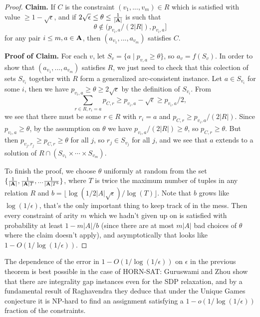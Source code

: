 \documentclass[letterpaper,11pt]{article}
\begin{document}
\begin{proof}
{\bf Claim.} If $C$ is the constraint $(v_1, ..., v_m) \in R$ which is satisfied with value $\ge 1 - \sqrt{\epsilon}$, and if $2\sqrt{\epsilon} \le \theta \le \frac{1}{|\mathbf{A}|}$ is such that
\[
\theta \not\in (p_{v_i,a}/(2|R|), p_{v_i,a}]
\]
for any pair $i \le m, a \in \mathbf{A}$, then $(a_{v_1}, ..., a_{v_m})$ satisfies $C$.

{\bf Proof of Claim.} For each $v$, let $S_v = \{a \mid p_{v,a} \ge \theta\}$, so $a_v = f(S_v)$. In order to show that $(a_{v_1}, ..., a_{v_m})$ satisfies $R$, we just need to check that this colection of sets $S_{v_i}$ together with $R$ form a generalized arc-consistent instance. Let $a \in S_{v_i}$ for some $i$, then we have $p_{v_i,a} \ge \theta \ge 2\sqrt{\epsilon}$ by the definition of $S_{v_i}$. From
\[
\sum_{r \in R, r_i = a} p_{C,r} \ge p_{v_i,a} - \sqrt{\epsilon} \ge p_{v_i,a}/2,
\]
we see that there must be some $r \in R$ with $r_i = a$ and $p_{C,r} \ge p_{v_i,a}/(2|R|)$. Since $p_{v_i,a} \ge \theta$, by the assumption on $\theta$ we have $p_{v_i,a}/(2|R|) \ge \theta$, so $p_{C,r} \ge \theta$. But then $p_{v_j,r_j} \ge p_{C,r} \ge \theta$ for all $j$, so $r_j \in S_{v_j}$ for all $j$, and we see that $a$ extends to a solution of $R \cap (S_{v_1} \times \cdots \times S_{v_m})$.

To finish the proof, we choose $\theta$ uniformly at random from the set $\{\frac{1}{|\mathbf{A}|}, \frac{1}{|\mathbf{A}|T}, ... \frac{1}{|\mathbf{A}|T^b}\}$, where $T$ is twice the maximum number of tuples in any relation $R$ and $b = \lfloor \log(1/2|A|\sqrt{\epsilon})/\log(T) \rfloor$. Note that $b$ grows like $\log(1/\epsilon)$, that's the only important thing to keep track of in the mess. Then every constraint of arity $m$ which we hadn't given up on is satisfied with probability at least $1 - m|A|/b$ (since there are at most $m|A|$ bad choices of $\theta$ where the claim doesn't apply), and asymptotically that looks like $1 - O(1/\log(1/\epsilon))$.
\end{proof}

\begin{rem} The dependence of the error in $1 - O(1/\log(1/\epsilon))$ on $\epsilon$ in the previous theorem is best possible in the case of HORN-SAT: Guruswami and Zhou \cite{robust-horn-gap} show that there are integrality gap instances even for the SDP relaxation, and by a fundamental result of Raghavendra \cite{raghavendra-optimal} they deduce that under the Unique Games conjecture it is NP-hard to find an assignment satisfying a $1-o(1/\log(1/\epsilon))$ fraction of the constraints.
\end{rem}
\end{document}

